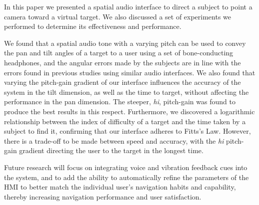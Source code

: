 \documentclass[format=sigconf, review=true, screen=true, anonymous=true]{acmart}
\begin{document}
In this paper we presented a spatial audio interface to direct a subject to point a camera toward a virtual target. We also discussed a set of experiments we performed to determine its effectiveness and performance. %

We found that a spatial audio tone with a varying pitch can be used to convey the pan and tilt angles of a target to a user using a set of bone-conducting headphones, and the angular errors made by the subjects are in line with the errors found in previous studies using similar audio interfaces. We also found that varying the pitch-gain gradient of our interface influences the accuracy of the system in the tilt dimension, as well as the time to target, without affecting the performance in the pan dimension. The steeper, \emph{hi}, pitch-gain was found to produce the best results in this respect. Furthermore, we discovered a logarithmic relationship between the index of difficulty of a target and the time taken by a subject to find it, confirming that our interface adheres to Fitts's Law. However, there is a trade-off to be made between speed and accuracy, with the \emph{hi} pitch-gain gradient directing the user to the target in the longest time. 

Future research will focus on integrating voice and vibration feedback cues into the system, and to add the ability to automatically refine the parameters of the HMI to better match the individual user's navigation habits and capability, thereby increasing navigation performance and user satisfaction.





\end{document}
